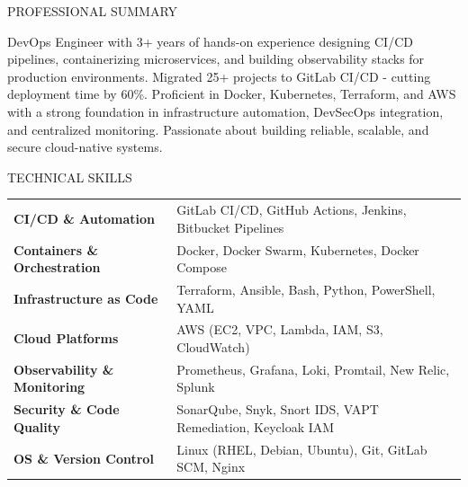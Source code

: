 \documentclass{resume} %
\begin{document}

\begin{rSection}{PROFESSIONAL SUMMARY}

{DevOps Engineer with 3+ years of hands-on experience designing CI/CD pipelines, containerizing microservices, and building observability stacks for production environments. Migrated 25+ projects to GitLab CI/CD - cutting deployment time by 60\%. Proficient in Docker, Kubernetes, Terraform, and AWS with a strong foundation in infrastructure automation, DevSecOps integration, and centralized monitoring. Passionate about building reliable, scalable, and secure cloud-native systems.}

\end{rSection}

\begin{rSection}{TECHNICAL SKILLS}

\begin{tabular}{ @{} >{\bfseries}l @{\hspace{6ex}} l }
CI/CD \& Automation & GitLab CI/CD, GitHub Actions, Jenkins, Bitbucket Pipelines
\\
Containers \& Orchestration & Docker, Docker Swarm, Kubernetes, Docker Compose \\
Infrastructure as Code & Terraform, Ansible, Bash, Python, PowerShell, YAML \\
Cloud Platforms & AWS (EC2, VPC, Lambda, IAM, S3, CloudWatch) \\
Observability \& Monitoring & Prometheus, Grafana, Loki, Promtail, New Relic, Splunk \\
Security \& Code Quality & SonarQube, Snyk, Snort IDS, VAPT Remediation, Keycloak IAM \\
OS \& Version Control & Linux (RHEL, Debian, Ubuntu), Git, GitLab SCM, Nginx \\
\end{tabular}\\
\end{rSection}

\end{document}
